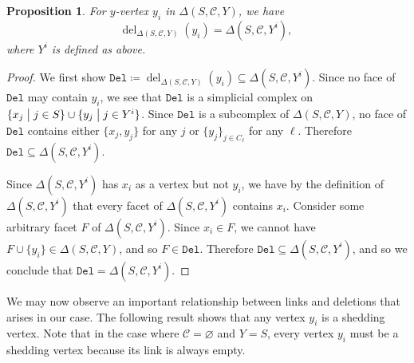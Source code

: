 \documentclass[10pt]{amsart}
\numberwithin{equation}{section}
\newtheorem{prop}[thm]{Proposition}
\theoremstyle{definition}
\theoremstyle{remark}
\newcommand{\st}{\bigm\vert}
\newcommand{\sC}{\mathscr{C}}
\newcommand{\D}{\mathtt{Del}}
\renewcommand{\emptyset}{\varnothing}
\DeclareMathOperator{\del}{\mathrm{del}}
\newcommand{\1}{^{-1}}
\begin{document}
\begin{prop}\label{del}
For $y$-vertex $y_i$ in $\Delta(S,\sC,Y)$, we have
\[
\del_{\Delta(S,\sC,Y)}(y_i) = \Delta(S,\sC,Y^i), \
\]
where $Y^i$ is defined as above.
\end{prop}
\begin{proof}
We first show $\D \coloneqq \del_{\Delta(S,\sC,Y)}(y_i) \subseteq
\Delta(S,\sC,Y^i)$. Since no face of $\D$ may contain $y_i$, we see
that $\D$ is a simplicial complex on $\{x_j \st j \in S\} \cup \{y_j
\st j \in Y^i\}$. Since $\D$ is a subcomplex of $\Delta(S,\sC,Y)$, no
face of $\D$ contains either $\{x_j,y_j\}$ for any $j$ or $\{y_j\}_{j
  \in C_\ell}$ for any $\ell$. Therefore $\D \subseteq
\Delta(S,\sC,Y^i)$.

 Since $\Delta(S,\sC,Y^i)$ has $x_i$ as a vertex but not $y_i$, we have by the definition of $\Delta(S,\sC,Y^i)$ that every facet of $\Delta(S,\sC,Y^i)$ contains $x_i$. Consider some arbitrary facet $F$ of $\Delta(S,\sC,Y^i)$. Since $x_i \in F$, we cannot have $F \cup \{y_i\} \in \Delta(S,\sC,Y)$, and so $F \in \D$. Therefore $\D \subseteq \Delta(S,\sC,Y^i)$, and so we conclude that $\D = \Delta(S,\sC,Y^i)$.
\end{proof}
We may now observe an important relationship between links and deletions that arises in our case. The following result shows that any vertex $y_i$ is a shedding vertex. Note that in the case where $\sC = \emptyset$ and $Y=S$, every vertex $y_i$ must be a shedding vertex because its link is always empty.
\end{document}
